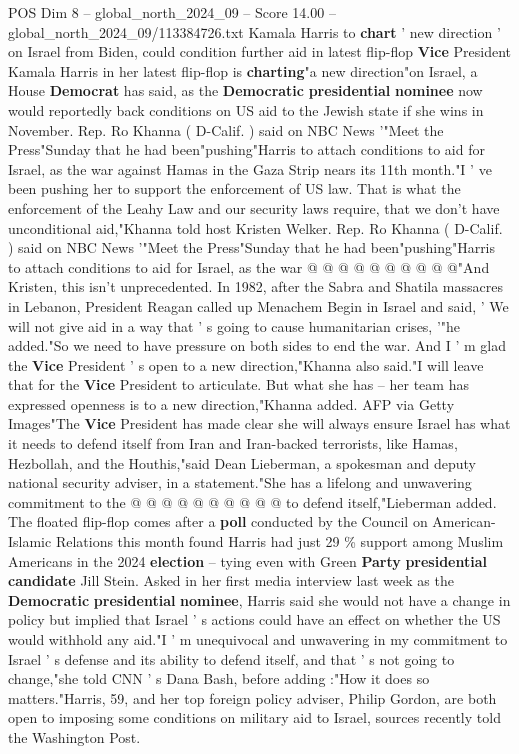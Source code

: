 \begin{textsample}{POS Dim 8 – global\_north\_2024\_09 – Score 14.00 – global\_north\_2024\_09/113384726.txt}  \label{ex:f8_pos_086}
Kamala Harris to \textbf{chart} ' new direction ' on Israel from Biden, could condition further aid in latest flip-flop \textbf{Vice} President Kamala Harris in her latest flip-flop is \textbf{charting}"a new direction"on Israel, a House \textbf{Democrat} has said, as the \textbf{Democratic} \textbf{presidential} \textbf{nominee} now would reportedly back conditions on US aid to the Jewish state if she wins in November.
Rep.
Ro Khanna ( D-Calif. ) said on NBC News '"Meet the Press"Sunday that he had been"pushing"Harris to attach conditions to aid for Israel, as the war against Hamas in the Gaza Strip nears its 11th month."I ' ve been pushing her to support the enforcement of US law.
That is what the enforcement of the Leahy Law and our security laws require, that we don't have unconditional aid,"Khanna told host Kristen Welker.
Rep.
Ro Khanna ( D-Calif. ) said on NBC News '"Meet the Press"Sunday that he had been"pushing"Harris to attach conditions to aid for Israel, as the war @ @ @ @ @ @ @ @ @ @"And Kristen, this isn't unprecedented.
In 1982, after the Sabra and Shatila massacres in Lebanon, President Reagan called up Menachem Begin in Israel and said, ' We will not give aid in a way that ' s going to cause humanitarian crises, '"he added."So we need to have pressure on both sides to end the war.
And I ' m glad the \textbf{Vice} President ' s open to a new direction,"Khanna also said."I will leave that for the \textbf{Vice} President to articulate.
But what she has -- her team has expressed openness is to a new direction,"Khanna added.
AFP via Getty Images"The \textbf{Vice} President has made clear she will always ensure Israel has what it needs to defend itself from Iran and Iran-backed terrorists, like Hamas, Hezbollah, and the Houthis,"said Dean Lieberman, a spokesman and deputy national security adviser, in a statement."She has a lifelong and unwavering commitment to the @ @ @ @ @ @ @ @ @ @ to defend itself,"Lieberman added.
The floated flip-flop comes after a \textbf{poll} conducted by the Council on American-Islamic Relations this month found Harris had just 29 \% support among Muslim Americans in the 2024 \textbf{election} -- tying even with Green \textbf{Party} \textbf{presidential} \textbf{candidate} Jill Stein.
Asked in her first media interview last week as the \textbf{Democratic} \textbf{presidential} \textbf{nominee}, Harris said she would not have a change in policy but implied that Israel ' s actions could have an effect on whether the US would withhold any aid."I ' m unequivocal and unwavering in my commitment to Israel ' s defense and its ability to defend itself, and that ' s not going to change,"she told CNN ' s Dana Bash, before adding :"How it does so matters."Harris, 59, and her top foreign policy adviser, Philip Gordon, are both open to imposing some conditions on military aid to Israel, sources recently told the Washington Post.

\end{textsample}
